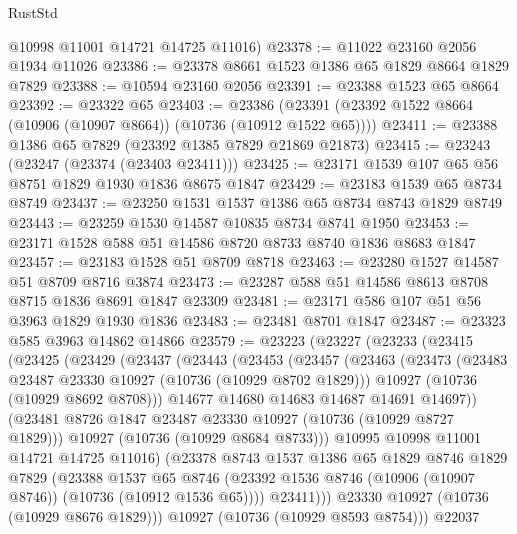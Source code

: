 \begin{lexlean}{RustStd}
\begin{coremodule}
      @10998
      @11001
      @14721
      @14725
      @11016)
@23378 := @11022 @23160 @2056 @1934 @11026
@23386 := @23378 @8661 @1523 @1386 @65 @1829 @8664 @1829 @7829
@23388 := @10594 @23160 @2056
@23391 := @23388 @1523 @65 @8664
@23392 := @23322 @65
@23403 := @23386 (@23391 (@23392 @1522 @8664 (@10906 (@10907 @8664)) (@10736 (@10912 @1522 @65))))
@23411 := @23388 @1386 @65 @7829 (@23392 @1385 @7829 @21869 @21873)
@23415 := @23243 (@23247 (@23374 (@23403 @23411)))
@23425 := @23171 @1539 @107 @65 @56 @8751 @1829 @1930 @1836 @8675 @1847
@23429 := @23183 @1539 @65 @8734 @8749
@23437 := @23250 @1531 @1537 @1386 @65 @8734 @8743 @1829 @8749
@23443 := @23259 @1530 @14587 @10835 @8734 @8741 @1950
@23453 := @23171 @1528 @588 @51 @14586 @8720 @8733 @8740 @1836 @8683 @1847
@23457 := @23183 @1528 @51 @8709 @8718
@23463 := @23280 @1527 @14587 @51 @8709 @8716 @3874
@23473 := @23287 @588 @51 @14586 @8613 @8708 @8715 @1836 @8691 @1847 @23309
@23481 := @23171 @586 @107 @51 @56 @3963 @1829 @1930 @1836
@23483 := @23481 @8701 @1847
@23487 := @23323 @585 @3963 @14862 @14866
@23579 := @23223
    (@23227
      (@23233
        (@23415
          (@23425
            (@23429
              (@23437
                (@23443
                  (@23453
                    (@23457
                      (@23463
                        (@23473
                          (@23483 @23487 @23330 @10927 (@10736 (@10929 @8702 @1829)))
                          @10927
                          (@10736 (@10929 @8692 @8708)))
                        @14677
                        @14680
                        @14683
                        @14687
                        @14691
                        @14697))
                    (@23481 @8726 @1847 @23487 @23330 @10927 (@10736 (@10929 @8727 @1829)))
                    @10927
                    (@10736 (@10929 @8684 @8733)))
                  @10995
                  @10998
                  @11001
                  @14721
                  @14725
                  @11016)
                (@23378
                  @8743
                  @1537
                  @1386
                  @65
                  @1829
                  @8746
                  @1829
                  @7829
                  (@23388
                    @1537
                    @65
                    @8746
                    (@23392 @1536 @8746 (@10906 (@10907 @8746)) (@10736 (@10912 @1536 @65))))
                  @23411)))
            @23330
            @10927
            (@10736 (@10929 @8676 @1829)))
          @10927
          (@10736 (@10929 @8593 @8754)))
        @22037

\end{coremodule}
\end{lexlean}
